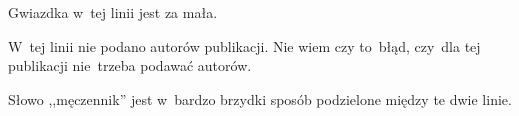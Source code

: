 \documentclass[a4paper,11pt]{article}
\begin{document}
\start {} Gwiazdka w~tej linii jest za mała.

\vspace{\spaceFour}


\start {} W~tej linii nie podano autorów publikacji. Nie
wiem czy to~błąd, czy~dla tej publikacji nie~trzeba podawać autorów.

\vspace{\spaceFour}


\start {} Słowo ,,męczennik'' jest
w~bardzo brzydki sposób podzielone między te dwie linie.








\end{document}
